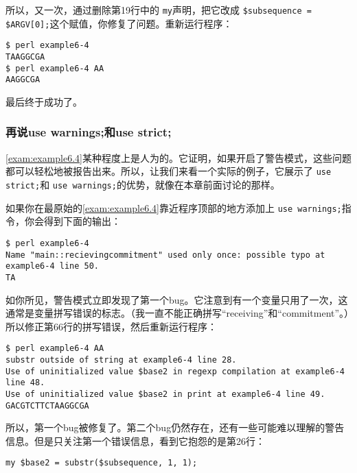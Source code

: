 所以，又一次，通过删除第19行中的 \verb|my|声明，把它改成 \verb|$subsequence = $ARGV[0];|这个赋值，你修复了问题。重新运行程序：

\begin{lstlisting}
$ perl example6-4
TAAGGCGA
$ perl example6-4 AA
AAGGCGA 
\end{lstlisting}

最后终于成功了。

\subsubsection{再说use warnings;和use strict;}
\autoref{exam:example6.4}某种程度上是人为的。它证明，如果开启了警告模式，这些问题都可以轻松地被报告出来。所以，让我们来看一个实际的例子，它展示了
\verb|use strict;|和 \verb|use warnings;|的优势，就像在本章前面讨论的那样。

如果你在最原始的\autoref{exam:example6.4}靠近程序顶部的地方添加上 \verb|use warnings;|指令，你会得到下面的输出：

\begin{lstlisting}
$ perl example6-4 
Name "main::recievingcommitment" used only once: possible typo at example6-4 line 50.
TA 
\end{lstlisting}

如你所见，警告模式立即发现了第一个bug。它注意到有一个变量只用了一次，这通常是变量拼写错误的标志。（我一直不能正确拼写“receiving”和“commitment”。）所以修正第66行的拼写错误，然后重新运行程序：

\begin{lstlisting}
$ perl example6-4 AA
substr outside of string at example6-4 line 28.
Use of uninitialized value $base2 in regexp compilation at example6-4 line 48.
Use of uninitialized value $base2 in print at example6-4 line 49.
GACGTCTTCTAAGGCGA
\end{lstlisting}

所以，第一个bug被修复了。第二个bug仍然存在，还有一些可能难以理解的警告信息。但是只关注第一个错误信息，看到它抱怨的是第26行：

\begin{lstlisting}
my $base2 = substr($subsequence, 1, 1);
\end{lstlisting}

